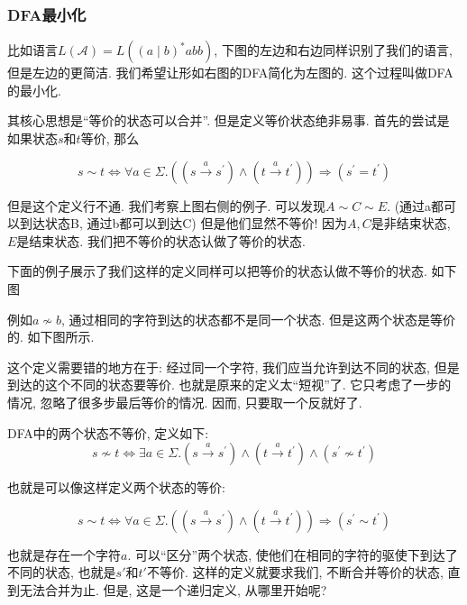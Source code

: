 \documentclass{ctexart}
\begin{document}
\subsubsection{DFA最小化} 比如语言$L(\mathcal{A})=L\left((a \mid b)^* a b b\right)$, 下图的左边和右边同样识别了我们的语言, 但是左边的更简洁. 我们希望让形如右图的DFA简化为左图的. 这个过程叫做DFA的最小化. 


其核心思想是``等价的状态可以合并''. 但是定义等价状态绝非易事. 首先的尝试是如果状态$s$和$t$等价, 那么

$$s \sim t \Longleftrightarrow \forall a \in \Sigma .\left(\left(s \xrightarrow{a} s^{\prime}\right) \wedge\left(t \xrightarrow{a} t^{\prime}\right)\right) \Longrightarrow\left(s^{\prime}=t^{\prime}\right)$$

但是这个定义行不通. 我们考察上图右侧的例子. 可以发现$A\sim C\sim E$. (通过a都可以到达状态B, 通过b都可以到达C) 但是他们显然不等价! 因为$A, C$是非结束状态, $E$是结束状态. 我们把不等价的状态认做了等价的状态. 

下面的例子展示了我们这样的定义同样可以把等价的状态认做不等价的状态. 如下图


例如$a \nsim b$, 通过相同的字符到达的状态都不是同一个状态. 但是这两个状态是等价的. 如下图所示. 


这个定义需要错的地方在于: 经过同一个字符, 我们应当允许到达不同的状态, 但是到达的这个不同的状态要等价. 也就是原来的定义太``短视''了. 它只考虑了一步的情况, 忽略了很多步最后等价的情况. 因而, 只要取一个反就好了. 

\begin{definition}
    DFA中的两个状态不等价, 定义如下: 
    $$s \nsim t \Longleftrightarrow \exists a \in \Sigma .\left(s \xrightarrow{a} s^{\prime}\right) \wedge\left(t \xrightarrow{a} t^{\prime}\right) \wedge\left(s^{\prime} \nsim t^{\prime}\right)$$

    也就是可以像这样定义两个状态的等价: 

    $$s \sim t \Longleftrightarrow \forall a \in \Sigma .\left(\left(s \xrightarrow{a} s^{\prime}\right) \wedge\left(t \xrightarrow{a} t^{\prime}\right)\right) \Longrightarrow\left(s^{\prime} \sim t^{\prime}\right)$$
\end{definition}

也就是存在一个字符$a$. 可以``区分''两个状态, 使他们在相同的字符的驱使下到达了不同的状态, 也就是$s'$和$t'$不等价. 这样的定义就要求我们, 不断合并等价的状态, 直到无法合并为止. 但是, 这是一个递归定义, 从哪里开始呢? 
\end{document}
